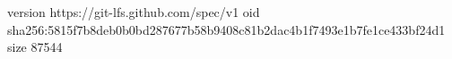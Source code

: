 version https://git-lfs.github.com/spec/v1
oid sha256:5815f7b8deb0b0bd287677b58b9408c81b2dac4b1f7493e1b7fe1ce433bf24d1
size 87544
